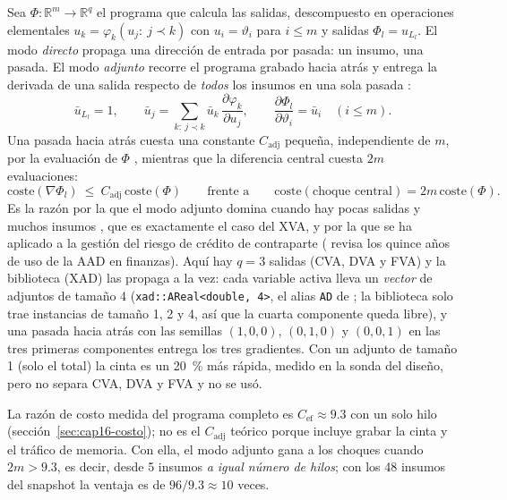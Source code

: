\begin{sloppypar}
Sea $\Phi:\mathbb R^m\to\mathbb R^q$ el programa que calcula las salidas, descompuesto en operaciones elementales
$u_k=\varphi_k(u_j:\ j\prec k)$ con $u_i=\vartheta_i$ para $i\le m$ y salidas $\Phi_l=u_{L_l}$. El modo
\emph{directo} propaga una dirección de entrada por pasada: un insumo, una pasada. El modo \emph{adjunto} recorre el
programa grabado hacia atrás y entrega la derivada de una salida respecto de \emph{todos} los insumos en una sola
pasada \citep{griewank2008,naumann2011}:
\begin{equation}\label{eq:cap16-adjunto}
  \bar u_{L_l}=1,\qquad
  \bar u_j=\sum_{k:\ j\prec k}\bar u_k\,\frac{\partial\varphi_k}{\partial u_j},\qquad
  \frac{\partial\Phi_l}{\partial\vartheta_i}=\bar u_i\quad(i\le m).
\end{equation}
Una pasada hacia atrás cuesta una constante $C_{\mathrm{adj}}$ pequeña, independiente de $m$, por la evaluación de $\Phi$
\citep{griewank2008}, mientras que la diferencia central cuesta $2m$ evaluaciones:
\begin{equation}\label{eq:cap16-costo}
  \mathrm{coste}(\nabla\Phi_l)\ \le\ C_{\mathrm{adj}}\,\mathrm{coste}(\Phi)\qquad\text{frente a}\qquad
  \mathrm{coste}(\text{choque central})=2m\,\mathrm{coste}(\Phi).
\end{equation}
Es la razón por la que el modo adjunto domina cuando hay pocas salidas y muchos insumos
\citep{giles2005,capriotti2011}, que es exactamente el caso del XVA, y por la que se ha aplicado a la
gestión del riesgo de crédito de contraparte \citep{capriotti2011b} (\citealp{capriotti2024} revisa los quince años de
uso de la AAD en finanzas). Aquí hay $q=3$ salidas (CVA, DVA y FVA) y la biblioteca (XAD) las propaga a la vez: cada variable
activa lleva un \emph{vector} de adjuntos de tamaño 4 (\texttt{xad::AReal<double, 4>}, el alias \texttt{AD} de
; la biblioteca solo trae instancias de
tamaño 1, 2 y 4, así que la cuarta componente queda libre), y una pasada hacia atrás con las semillas $(1,0,0)$, $(0,1,0)$ y
$(0,0,1)$ en las tres primeras componentes entrega los tres gradientes. Con un adjunto de tamaño 1 (solo el total) la
cinta es un 20~\% más rápida, medido en la sonda del diseño, pero no separa CVA, DVA y FVA y no se usó.

La razón de costo medida del programa completo es $C_{\mathrm{ef}}\approx9.3$ con un solo hilo
(sección~\ref{sec:cap16-costo}); no es el $C_{\mathrm{adj}}$ teórico porque incluye grabar la cinta y el tráfico de memoria. Con
ella, el modo adjunto gana a los choques cuando $2m>9.3$, es decir, desde 5 insumos \emph{a igual número de hilos};
con los 48 insumos del snapshot la ventaja es de $96/9.3\approx10$ veces.


\end{sloppypar}

